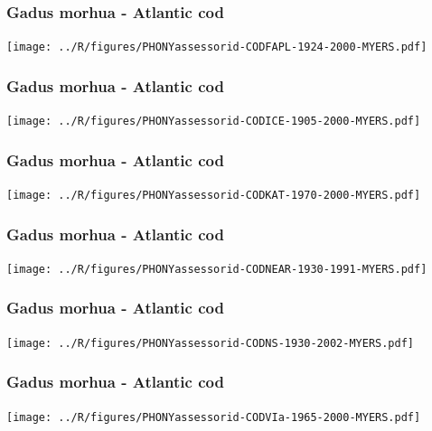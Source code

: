 \subsubsection{Gadus morhua - Atlantic cod}
\begin{center}
\texttt{[image: ../R/figures/PHONYassessorid-CODFAPL-1924-2000-MYERS.pdf]}
\end{center}

\subsubsection{Gadus morhua - Atlantic cod}
\begin{center}
\texttt{[image: ../R/figures/PHONYassessorid-CODICE-1905-2000-MYERS.pdf]}
\end{center}

\subsubsection{Gadus morhua - Atlantic cod}
\begin{center}
\texttt{[image: ../R/figures/PHONYassessorid-CODKAT-1970-2000-MYERS.pdf]}
\end{center}

\subsubsection{Gadus morhua - Atlantic cod}
\begin{center}
\texttt{[image: ../R/figures/PHONYassessorid-CODNEAR-1930-1991-MYERS.pdf]}
\end{center}

\subsubsection{Gadus morhua - Atlantic cod}
\begin{center}
\texttt{[image: ../R/figures/PHONYassessorid-CODNS-1930-2002-MYERS.pdf]}
\end{center}

\subsubsection{Gadus morhua - Atlantic cod}
\begin{center}
\texttt{[image: ../R/figures/PHONYassessorid-CODVIa-1965-2000-MYERS.pdf]}
\end{center}

